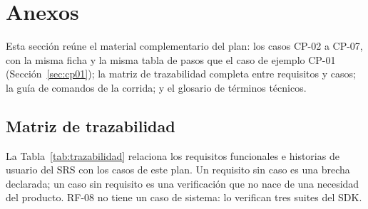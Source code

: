\section{Anexos}
\label{sec:anexos}

Esta sección reúne el material complementario del plan: los casos CP-02 a CP-07, con la misma ficha y la misma tabla de pasos que el caso de ejemplo CP-01 (Sección~\ref{sec:cp01}); la matriz de trazabilidad completa entre requisitos y casos; la guía de comandos de la corrida; y el glosario de términos técnicos.








\subsection{Matriz de trazabilidad}

La Tabla~\ref{tab:trazabilidad} relaciona los requisitos funcionales e historias de usuario del SRS con los casos de este plan. Un requisito sin caso es una brecha declarada; un caso sin requisito es una verificación que no nace de una necesidad del producto. RF-08 no tiene un caso de sistema: lo verifican tres suites del SDK.

